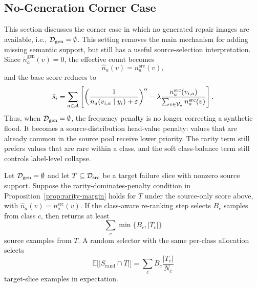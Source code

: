 \subsection{No-Generation Corner Case}
\label{app:no-generation-corner-case}

This section discusses the corner case in which no generated repair images are available, i.e., $\mathcal{D}_{\mathrm{gen}}=\emptyset$. This setting removes the main mechanism for adding missing semantic support, but \model still has a useful source-selection interpretation. Since $\tilde{n}_a^{\mathrm{gen}}(v)=0$, the effective count becomes
\begin{equation}
\hat{n}_a(v)=n_a^{\mathrm{src}}(v),
\end{equation}
and the base score reduces to
\begin{equation}
\bar{s}_i
=
\sum_{a \in \mathcal{A}}
\left[
\left(\frac{1}{n_a(v_{i,a}\mid y_i)+\varepsilon}\right)^\alpha
-
\lambda
\frac{n_a^{\mathrm{src}}(v_{i,a})}{\sum_{v\in\mathcal{V}_a} n_a^{\mathrm{src}}(v)}
\right].
\end{equation}
Thus, when $\mathcal{D}_{\mathrm{gen}}=\emptyset$, the frequency penalty is no longer correcting a synthetic flood. It becomes a source-distribution head-value penalty: values that are already common in the source pool receive lower priority. The rarity term still prefers values that are rare within a class, and the soft class-balance term still controls label-level collapse.

\begin{tcolorbox}[
    colback=blue!2!white,
    colframe=blue!20!white,
    arc=3pt,
    boxrule=1pt,
    drop shadow,
    breakable
]
\begin{proposition}
Let $\mathcal{D}_{\mathrm{gen}}=\emptyset$ and let $T\subseteq\mathcal{D}_{\mathrm{src}}$ be a target failure slice with nonzero source support. Suppose the rarity-dominates-penalty condition in Proposition~\ref{prop:rarity-margin} holds for $T$ under the source-only score above, with $\hat{n}_a(v)=n_a^{\mathrm{src}}(v)$. If the class-aware re-ranking step selects $B_c$ samples from class $c$, then \model returns at least
\begin{equation}
\sum_c \min\{B_c, |T_c|\}
\end{equation}
source examples from $T$. A random selector with the same per-class allocation selects
\begin{equation}
\mathbb{E}\big[|S_{\mathrm{rand}}\cap T|\big]
=
\sum_c B_c\frac{|T_c|}{N_c}
\end{equation}
target-slice examples in expectation.
\end{proposition}
\end{tcolorbox}

